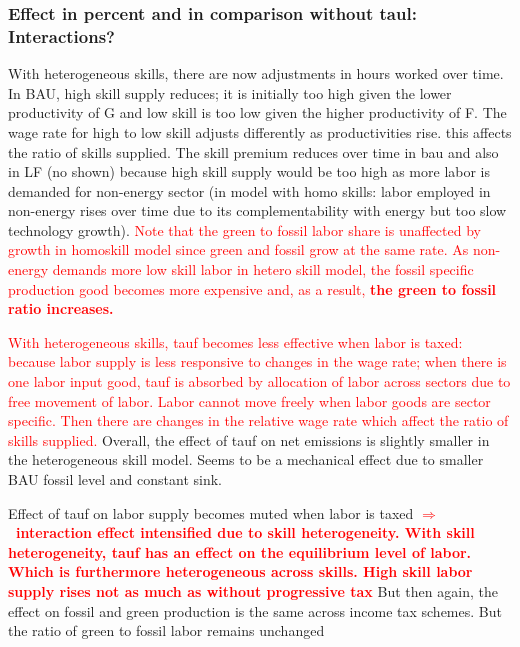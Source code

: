 \documentclass[12pt]{article}
\newcommand{\ar}{$\Rightarrow$ \ }
\newcommand{\tr}[1]{\textcolor{red}{#1}}
\begin{document}
\subsubsection{Effect in percent and in comparison without taul: Interactions?}
With heterogeneous skills, there are now adjustments in hours worked over time. In BAU, high skill supply reduces; it is initially too high given the lower productivity of G and low skill is too low given the higher productivity of F. The wage rate for high to low skill adjusts differently as productivities rise. this affects the ratio of skills supplied. The skill premium reduces over time in bau and also in LF (no shown) because high skill supply would be too high as more labor is demanded for non-energy sector (in model with homo skills: labor employed in non-energy rises over time due to its complementability with energy but too slow technology growth). \tr{Note that the green to fossil labor share is unaffected by growth in homoskill model since green and fossil grow at the same rate. As non-energy demands more low skill labor in hetero skill model, the fossil specific production good becomes more expensive and, as a result,\textbf{ the green to fossil ratio increases.}}

\tr{With heterogeneous skills, tauf becomes less effective when labor is taxed: because labor supply is less responsive to changes in the wage rate; when there is one labor input good, tauf is absorbed by allocation of labor across sectors due to free movement of labor. Labor cannot move freely when labor goods are sector specific. Then there are changes in the relative wage rate which affect the ratio of skills supplied. }
Overall, the effect of tauf on net emissions is slightly smaller in the heterogeneous skill model. Seems to be a mechanical effect due to smaller BAU fossil level and constant sink.
 
 Effect of tauf on labor supply becomes muted when labor is taxed \tr{\textbf{\ar interaction effect intensified due to skill heterogeneity. With skill heterogeneity, tauf has an effect on the equilibrium level of labor. Which is furthermore heterogeneous across skills. High skill labor supply rises not as much as without progressive tax }} But then again, the effect on fossil and green production is the same across income tax schemes. But the ratio of green to fossil labor remains unchanged
\end{document}
